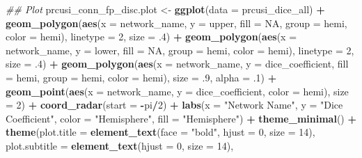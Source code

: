 \documentclass[
]{article}
\newenvironment{Shaded}{\begin{snugshade}}{\end{snugshade}}
\newcommand{\CommentTok}[1]{\textcolor[rgb]{0.56,0.35,0.01}{\textit{#1}}}
\newcommand{\DataTypeTok}[1]{\textcolor[rgb]{0.13,0.29,0.53}{#1}}
\newcommand{\DecValTok}[1]{\textcolor[rgb]{0.00,0.00,0.81}{#1}}
\newcommand{\FloatTok}[1]{\textcolor[rgb]{0.00,0.00,0.81}{#1}}
\newcommand{\KeywordTok}[1]{\textcolor[rgb]{0.13,0.29,0.53}{\textbf{#1}}}
\newcommand{\NormalTok}[1]{#1}
\newcommand{\OperatorTok}[1]{\textcolor[rgb]{0.81,0.36,0.00}{\textbf{#1}}}
\newcommand{\OtherTok}[1]{\textcolor[rgb]{0.56,0.35,0.01}{#1}}
\newcommand{\StringTok}[1]{\textcolor[rgb]{0.31,0.60,0.02}{#1}}
\begin{document}
\begin{Shaded}
\begin{Highlighting}[]
{{\CommentTok{## Plot}
\NormalTok{prcusi_conn_fp_disc.plot <-}\StringTok{ }\KeywordTok{ggplot}\NormalTok{(}\DataTypeTok{data =}\NormalTok{ prcusi_dice_all) }\OperatorTok{+}\StringTok{  }
\StringTok{  }\KeywordTok{geom_polygon}\NormalTok{(}\KeywordTok{aes}\NormalTok{(}\DataTypeTok{x =}\NormalTok{ network_name, }\DataTypeTok{y =}\NormalTok{ upper, }\DataTypeTok{fill =} \OtherTok{NA}\NormalTok{, }\DataTypeTok{group =}\NormalTok{ hemi, }\DataTypeTok{color =}\NormalTok{ hemi), }
               \DataTypeTok{linetype =} \DecValTok{2}\NormalTok{, }\DataTypeTok{size =} \FloatTok{.4}\NormalTok{) }\OperatorTok{+}\StringTok{ }
\StringTok{  }\KeywordTok{geom_polygon}\NormalTok{(}\KeywordTok{aes}\NormalTok{(}\DataTypeTok{x =}\NormalTok{ network_name, }\DataTypeTok{y =}\NormalTok{ lower, }\DataTypeTok{fill =} \OtherTok{NA}\NormalTok{, }\DataTypeTok{group =}\NormalTok{ hemi, }\DataTypeTok{color =}\NormalTok{ hemi), }
               \DataTypeTok{linetype =} \DecValTok{2}\NormalTok{, }\DataTypeTok{size =} \FloatTok{.4}\NormalTok{) }\OperatorTok{+}
\StringTok{  }\KeywordTok{geom_polygon}\NormalTok{(}\KeywordTok{aes}\NormalTok{(}\DataTypeTok{x =}\NormalTok{ network_name, }\DataTypeTok{y =}\NormalTok{ dice_coefficient, }\DataTypeTok{fill =}\NormalTok{ hemi, }\DataTypeTok{group =}\NormalTok{ hemi, }\DataTypeTok{color =}\NormalTok{ hemi), }
               \DataTypeTok{size =} \FloatTok{.9}\NormalTok{, }\DataTypeTok{alpha =} \FloatTok{.1}\NormalTok{) }\OperatorTok{+}
\StringTok{  }\KeywordTok{geom_point}\NormalTok{(}\KeywordTok{aes}\NormalTok{(}\DataTypeTok{x =}\NormalTok{ network_name, }\DataTypeTok{y =}\NormalTok{ dice_coefficient, }\DataTypeTok{color =}\NormalTok{ hemi), }\DataTypeTok{size =} \DecValTok{2}\NormalTok{) }\OperatorTok{+}\StringTok{ }
\StringTok{  }\KeywordTok{coord_radar}\NormalTok{(}\DataTypeTok{start =} \OperatorTok{-}\NormalTok{pi}\OperatorTok{/}\DecValTok{2}\NormalTok{) }\OperatorTok{+}
\StringTok{  }\KeywordTok{labs}\NormalTok{(}\DataTypeTok{x =} \StringTok{"Network Name"}\NormalTok{,}
       \DataTypeTok{y =} \StringTok{"Dice Coefficient"}\NormalTok{, }
       \DataTypeTok{color =} \StringTok{"Hemisphere"}\NormalTok{,}
       \DataTypeTok{fill =} \StringTok{"Hemisphere"}\NormalTok{) }\OperatorTok{+}\StringTok{  }
\StringTok{  }\KeywordTok{theme_minimal}\NormalTok{() }\OperatorTok{+}
\StringTok{   }\KeywordTok{theme}\NormalTok{(}\DataTypeTok{plot.title =} \KeywordTok{element_text}\NormalTok{(}\DataTypeTok{face =} \StringTok{"bold"}\NormalTok{, }\DataTypeTok{hjust =} \DecValTok{0}\NormalTok{, }\DataTypeTok{size =} \DecValTok{14}\NormalTok{), }
        \DataTypeTok{plot.subtitle =} \KeywordTok{element_text}\NormalTok{(}\DataTypeTok{hjust =} \DecValTok{0}\NormalTok{, }\DataTypeTok{size =} \DecValTok{14}\NormalTok{),}
}}
\end{Highlighting}
\end{Shaded}
\end{document}
